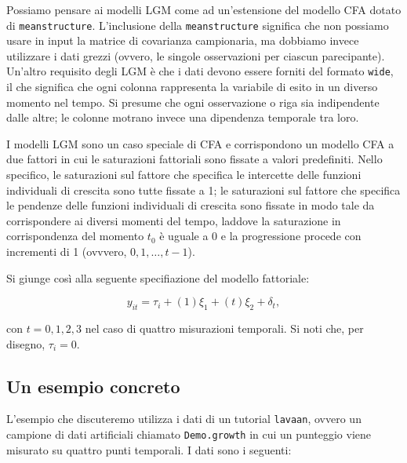 \documentclass[
  11pt,
]{krantz}
\theoremstyle{definition}
\theoremstyle{definition}
\theoremstyle{definition}
\theoremstyle{definition}
\theoremstyle{remark}
\begin{document}
Possiamo pensare ai modelli LGM come ad un'estensione del modello CFA dotato di \texttt{meanstructure}. L'inclusione della \texttt{meanstructure} significa che non possiamo usare in input la matrice di covarianza campionaria, ma dobbiamo invece utilizzare i dati grezzi (ovvero, le singole osservazioni per ciascun parecipante). Un'altro requisito degli LGM è che i dati devono essere forniti del formato \texttt{wide}, il che significa che ogni colonna rappresenta la variabile di esito in un diverso momento nel tempo. Si presume che ogni osservazione o riga sia indipendente dalle altre; le colonne motrano invece una dipendenza temporale tra loro.

I modelli LGM sono un caso speciale di CFA e corrispondono un modello CFA a due fattori in cui le saturazioni fattoriali sono fissate a valori predefiniti. Nello specifico, le saturazioni sul fattore che specifica le intercette delle funzioni individuali di crescita sono tutte fissate a 1; le saturazioni sul fattore che specifica le pendenze delle funzioni individuali di crescita sono fissate in modo tale da corrispondere ai diversi momenti del tempo, laddove la saturazione in corrispondenza del momento \(t_0\) è uguale a 0 e la progressione procede con incrementi di 1 (ovvvero, \(0, 1, \dots, t-1\)).

Si giunge così alla seguente specifiazione del modello fattoriale:

\begin{equation}
y_{it} = \tau_i + (1) \xi_1 + (t) \xi_2 + \delta_t,
\end{equation}

con \(t = 0, 1, 2, 3\) nel caso di quattro misurazioni temporali. Si noti che, per disegno, \(\tau_i = 0\).

\hypertarget{un-esempio-concreto-4}{%
\subsection{Un esempio concreto}\label{un-esempio-concreto-4}}

L'esempio che discuteremo utilizza i dati di un tutorial \texttt{lavaan}, ovvero un campione di dati artificiali chiamato \texttt{Demo.growth} in cui un punteggio viene misurato su quattro punti temporali. I dati sono i seguenti:
\end{document}
